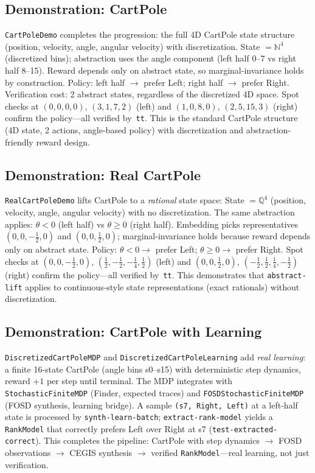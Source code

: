 \documentclass[9pt,a4paper]{article}
\theoremstyle{plain}
\theoremstyle{definition}
\theoremstyle{remark}
\begin{document}
\subsection{Demonstration: CartPole}

\texttt{CartPoleDemo} completes the progression: the full 4D CartPole state structure (position, velocity, angle, angular velocity) with discretization.  State $= \mathbb{N}^4$ (discretized bins); abstraction uses the angle component (left half 0--7 vs right half 8--15).  Reward depends only on abstract state, so marginal-invariance holds by construction.  Policy: left half $\to$ prefer Left; right half $\to$ prefer Right.  Verification cost: 2 abstract states, regardless of the discretized 4D space.  Spot checks at $(0,0,0,0)$, $(3,1,7,2)$ (left) and $(1,0,8,0)$, $(2,5,15,3)$ (right) confirm the policy---all verified by~\texttt{tt}.  This is the standard CartPole structure (4D state, 2 actions, angle-based policy) with discretization and abstraction-friendly reward design.

\subsection{Demonstration: Real CartPole}

\texttt{RealCartPoleDemo} lifts CartPole to a \emph{rational} state space: State $= \mathbb{Q}^4$ (position, velocity, angle, angular velocity) with no discretization.  The same abstraction applies: $\theta < 0$ (left half) vs $\theta \ge 0$ (right half).  Embedding picks representatives $(0,0,-\tfrac{1}{2},0)$ and $(0,0,\tfrac{1}{2},0)$; marginal-invariance holds because reward depends only on abstract state.  Policy: $\theta < 0 \to$ prefer Left; $\theta \ge 0 \to$ prefer Right.  Spot checks at $(0,0,-\tfrac{1}{2},0)$, $(\tfrac{1}{2},-\tfrac{1}{2},-\tfrac{1}{4},\tfrac{1}{2})$ (left) and $(0,0,\tfrac{1}{2},0)$, $(-\tfrac{1}{2},\tfrac{1}{2},\tfrac{1}{4},-\tfrac{1}{2})$ (right) confirm the policy---all verified by~\texttt{tt}.  This demonstrates that \texttt{abstract-lift} applies to continuous-style state representations (exact rationals) without discretization.

\subsection{Demonstration: CartPole with Learning}

\texttt{DiscretizedCartPoleMDP} and \texttt{DiscretizedCartPoleLearning} add \emph{real learning}: a finite 16-state CartPole (angle bins s0--s15) with deterministic step dynamics, reward $+1$ per step until terminal.  The MDP integrates with \texttt{StochasticFiniteMDP} (Finder, expected traces) and \texttt{FOSDStochasticFiniteMDP} (FOSD synthesis, learning bridge).  A sample \texttt{(s7, Right, Left)} at a left-half state is processed by \texttt{synth-learn-batch}; \texttt{extract-rank-model} yields a \texttt{RankModel} that correctly prefers Left over Right at s7 (\texttt{test-extracted-correct}).  This completes the pipeline: CartPole with step dynamics $\to$ FOSD observations $\to$ CEGIS synthesis $\to$ verified \texttt{RankModel}---real learning, not just verification.
\end{document}
